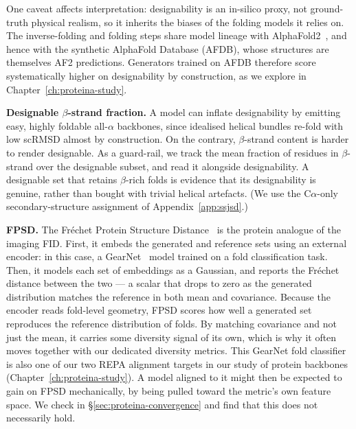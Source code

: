 \documentclass[12pt,a4paper,twoside]{report}
\begin{document}
One caveat affects interpretation: designability is an in-silico proxy, not ground-truth physical realism, so it inherits the biases of the folding models it relies on. The inverse-folding and folding steps share model lineage with AlphaFold2~\cite{AlphaFold2}, and hence with the synthetic AlphaFold Database (AFDB), whose structures are themselves AF2 predictions. Generators trained on AFDB therefore score systematically higher on designability by construction, as we explore in Chapter~\ref{ch:proteina-study}.

\textbf{Designable $\beta$-strand fraction.} A model can inflate designability by emitting easy, highly foldable all-$\alpha$ backbones, since idealised helical bundles re-fold with low scRMSD almost by construction. On the contrary, $\beta$-strand content is harder to render designable. As a guard-rail, we track the mean fraction of residues in $\beta$-strand over the designable subset, and read it alongside designability. A designable set that retains $\beta$-rich folds is evidence that its designability is genuine, rather than bought with trivial helical artefacts. (We use the C$\alpha$-only secondary-structure assignment of Appendix~\ref{app:ssjsd}.)



\textbf{FPSD.} The Fr\'echet Protein Structure Distance~\cite{Proteina} is the protein analogue of the imaging FID. First, it embeds the generated and reference sets using an external encoder: in this case, a GearNet~\cite{GearNet} model trained on a fold classification task. Then, it models each set of embeddings as a Gaussian, and reports the Fr\'echet distance between the two --- a scalar that drops to zero as the generated distribution matches the reference in both mean and covariance. Because the encoder reads fold-level geometry, FPSD scores how well a generated set reproduces the reference distribution of folds. By matching covariance and not just the mean, it carries some diversity signal of its own, which is why it often moves together with our dedicated diversity metrics. This GearNet fold classifier is also one of our two REPA alignment targets in our study of protein backbones (Chapter~\ref{ch:proteina-study}). A model aligned to it might then be expected to gain on FPSD mechanically, by being pulled toward the metric's own feature space. We check in \S\ref{sec:proteina-convergence} and find that this does not necessarily hold.
\end{document}
